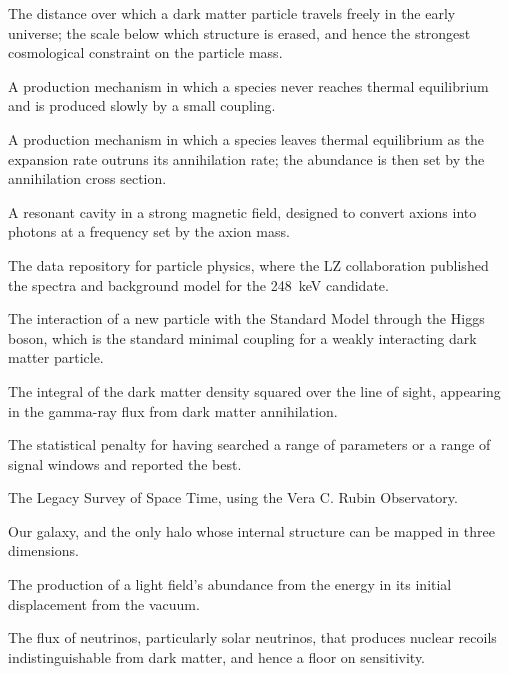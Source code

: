 \begin{description}[style=nextline,leftmargin=0pt,labelwidth=0pt,labelsep=0pt,
  font=\sffamily\bfseries\small,itemsep=5pt]
\item[Free-streaming length] The distance over which a dark matter particle
travels freely in the early universe; the scale below which structure is
erased, and hence the strongest cosmological constraint on the particle
mass.

\item[Freeze-in] A production mechanism in which a species never reaches
thermal equilibrium and is produced slowly by a small coupling.

\item[Freeze-out] A production mechanism in which a species leaves thermal
equilibrium as the expansion rate outruns its annihilation rate; the
abundance is then set by the annihilation cross section.

\item[Haloscope] A resonant cavity in a strong magnetic field, designed to
convert axions into photons at a frequency set by the axion mass.

\item[HEPData] The data repository for particle physics, where the LZ
collaboration published the spectra and background model for the 248~keV
candidate.

\item[Higgs portal] The interaction of a new particle with the Standard
Model through the Higgs boson, which is the standard minimal coupling for
a weakly interacting dark matter particle.

\item[J-factor] The integral of the dark matter density squared over the
line of sight, appearing in the gamma-ray flux from dark matter
annihilation.

\item[Look-elsewhere effect] The statistical penalty for having searched a
range of parameters or a range of signal windows and reported the best.

\item[LSST] The Legacy Survey of Space Time, using the Vera C. Rubin
Observatory.

\item[Milky Way] Our galaxy, and the only halo whose internal structure can
be mapped in three dimensions.

\item[Misalignment] The production of a light field's abundance from the
energy in its initial displacement from the vacuum.

\item[Neutrino fog] The flux of neutrinos, particularly solar neutrinos,
that produces nuclear recoils indistinguishable from dark matter, and hence
a floor on sensitivity.


\end{description}
